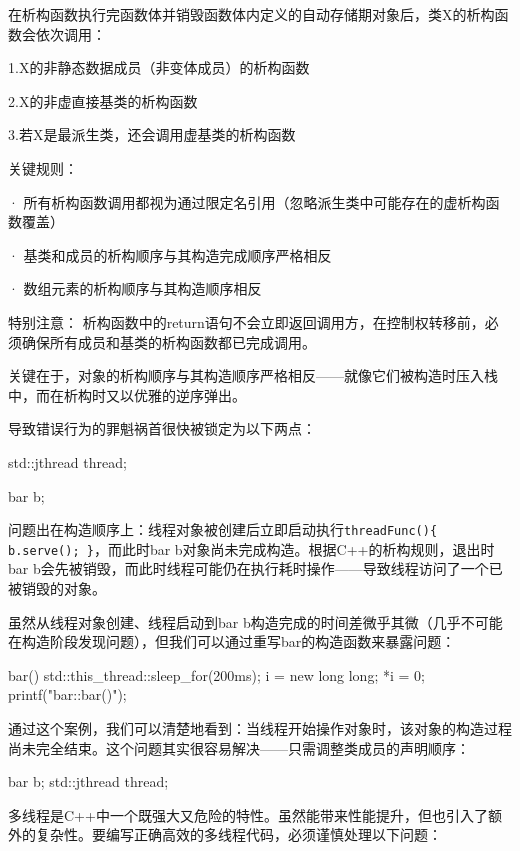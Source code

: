\begin{shell}
在析构函数执行完函数体并销毁函数体内定义的自动存储期对象后，类X的析构函数会依次调用：

1.X的非静态数据成员（非变体成员）的析构函数

2.X的非虚直接基类的析构函数

3.若X是最派生类，还会调用虚基类的析构函数

关键规则：

· 所有析构函数调用都视为通过限定名引用（忽略派生类中可能存在的虚析构函数覆盖）

· 基类和成员的析构顺序与其构造完成顺序严格相反

· 数组元素的析构顺序与其构造顺序相反

特别注意：
析构函数中的return语句不会立即返回调用方，在控制权转移前，必须确保所有成员和基类的析构函数都已完成调用。
\end{shell}

关键在于，对象的析构顺序与其构造顺序严格相反——就像它们被构造时压入栈中，而在析构时又以优雅的逆序弹出。

导致错误行为的罪魁祸首很快被锁定为以下两点：

\begin{cpp}
std::jthread thread;
\end{cpp}

\begin{cpp}
bar b;
\end{cpp}

问题出在构造顺序上：线程对象被创建后立即启动执行\verb|threadFunc(){ b.serve(); }|，而此时bar b对象尚未完成构造。根据C++的析构规则，退出时bar b会先被销毁，而此时线程可能仍在执行耗时操作——导致线程访问了一个已被销毁的对象。

虽然从线程对象创建、线程启动到bar b构造完成的时间差微乎其微（几乎不可能在构造阶段发现问题），但我们可以通过重写bar的构造函数来暴露问题：

\begin{cpp}
bar() { std::this_thread::sleep_for(200ms);
  i = new long long; *i = 0; printf("bar::bar()\n ");}
\end{cpp}

通过这个案例，我们可以清楚地看到：当线程开始操作对象时，该对象的构造过程尚未完全结束。这个问题其实很容易解决——只需调整类成员的声明顺序：

\begin{cpp}
bar b;
std::jthread thread;
\end{cpp}

多线程是C++中一个既强大又危险的特性。虽然能带来性能提升，但也引入了额外的复杂性。要编写正确高效的多线程代码，必须谨慎处理以下问题：


